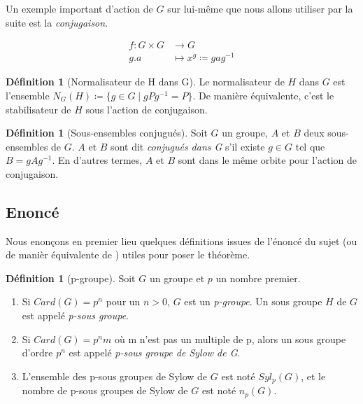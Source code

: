 \documentclass[french]{article}
\theoremstyle{definition}
\newtheorem{definition}[subsubsection]{Définition}
\theoremstyle{plain}
\theoremstyle{plain}
\theoremstyle{plain}
\theoremstyle{plain}
\theoremstyle{plain}
\begin{document}
Un exemple important d'action de \( G \) sur lui-même que nous allons utiliser par la suite est la \textit{conjugaison}.


\begin{align*}
	f : G \times G &\to G \\
	g . a &\mapsto x^{g} \coloneq gag^{-1}
\end{align*}

\begin{definition}[Normalisateur de H dans G]
	Le normalisateur de \( H \) dans \( G \) est l'ensemble 
	\( N_{G}({H}) \coloneq \{ g \in G \mid gPg^{-1} = P \} \).
	De manière équivalente, c'est le stabilisateur de \( H \) sous l'action de conjugaison.
\end{definition}

\begin{definition}[Sous-ensembles conjugués]
	Soit \( G \) un groupe, \( A \) et \( B \) deux sous-ensembles de \( G \). 
	\( A \) et \( B \) sont dit 
	\textit{conjugués dans G} s'il existe \( g \in G \) tel que \( B = gAg^{-1} \).
	En d'autres termes, \( A \) et \( B \) sont dans le même orbite pour l'action de conjugaison.
\end{definition}


\subsection{Enoncé}

Nous enonçons en premier lieu quelques définitions issues de l'énoncé du sujet (ou de manièr équivalente de \cite[p. ~123 et 139]{dummit2003abstract}) utiles pour poser le théorème.

\begin{definition}[p-groupe]
	Soit \( G \) un groupe et \( p \) un nombre premier.
	\begin{enumerate}[label = (\roman*)]
	\item Si \( Card(G) = p^{n} \) pour un \( n > 0 \), \( G \) est un \textit{p-groupe}. Un sous groupe \( H \) de \( G \) est appelé \textit{p-sous groupe}.
	\item Si \( Card(G) = p^{n}m \) où m n'est pas un multiple de p, alors un sous groupe d'ordre \( p^{n} \) est appelé \textit{p-sous groupe de Sylow de G}.
	\item L'ensemble des p-sous groupes de Sylow de \( G \) est noté \( Syl_{p}(G) \), et le nombre de p-sous groupes de Sylow de \( G \) est noté \( n_{p}(G) \).
	\end{enumerate}
\end{definition}
\end{document}

